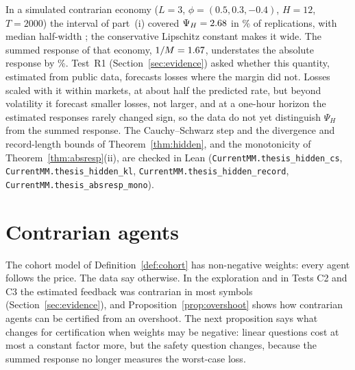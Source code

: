 In a simulated contrarian economy ($L=3$, $\phi=(0.5,0.3,-0.4)$, $H=12$, $T=2000$) the interval of part~(i) covered $\Psi_H=2.68$ in \UniformCover\% of replications, with median half-width \UniformHalfWidth{}; the conservative Lipschitz constant makes it wide. The summed response of that economy, $1/M=1.67$, understates the absolute response by \UniformUnderstate\%. Test~R1 (Section~\ref{sec:evidence}) asked whether this quantity, estimated from public data, forecasts losses where the margin did not. Losses scaled with it within markets, at about half the predicted rate, but beyond volatility it forecast smaller losses, not larger, and at a one-hour horizon the estimated responses rarely changed sign, so the data do not yet distinguish $\Psi_H$ from the summed response. The Cauchy--Schwarz step and the divergence and record-length bounds of Theorem~\ref{thm:hidden}, and the monotonicity of Theorem~\ref{thm:absresp}(ii), are checked in Lean (\nolinkurl{CurrentMM.thesis_hidden_cs}, \nolinkurl{CurrentMM.thesis_hidden_kl}, \nolinkurl{CurrentMM.thesis_hidden_record}, \nolinkurl{CurrentMM.thesis_absresp_mono}).

\section{Contrarian agents}\label{sec:signed}

The cohort model of Definition~\ref{def:cohort} has non-negative weights: every agent follows the price. The data say otherwise. In the exploration and in Tests C2 and C3 the estimated feedback was contrarian in most symbols (Section~\ref{sec:evidence}), and Proposition~\ref{prop:overshoot} shows how contrarian agents can be certified from an overshoot. The next proposition says what changes for certification when weights may be negative: linear questions cost at most a constant factor more, but the safety question changes, because the summed response no longer measures the worst-case loss.

